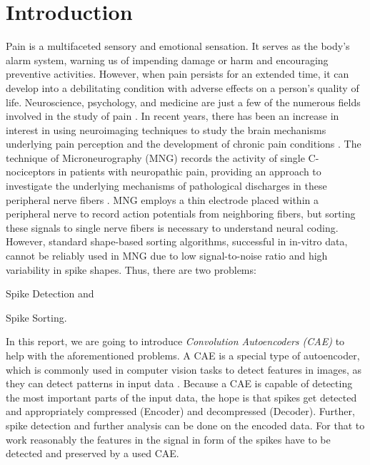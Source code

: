 \section{Introduction}
\label{sec:intro}
Pain is a multifaceted sensory and emotional sensation.
It serves as the body's alarm system, warning us of impending damage or harm and encouraging preventive activities.
However, when pain persists for an extended time, it can develop into a debilitating condition with adverse effects on a person's quality of life.
Neuroscience, psychology, and medicine are just a few of the numerous fields involved in the study of pain \cite{robins2016pain,eccleston2013psychological}.
In recent years, there has been an increase in interest in using neuroimaging techniques to study the brain mechanisms underlying pain perception and the development of chronic pain conditions \cite{schmidt2015neuroimaging, da2019neuroimaging}.
The technique of Microneurography (MNG) records the activity of single C-nociceptors in patients with neuropathic pain, providing an approach to investigate the underlying mechanisms of pathological discharges in these peripheral nerve fibers \cite{vallbo2004microneurography,vallbo2018microneurography}.
MNG employs a thin electrode placed within a peripheral nerve to record action potentials from neighboring fibers, but sorting these signals to single nerve fibers is necessary to understand neural coding. 
However, standard shape-based sorting algorithms, successful in in-vitro data, cannot be reliably used in MNG due to low signal-to-noise ratio and high variability in spike shapes. %
Thus, there are two problems: 
\begin{enumerate*}
	\item Spike Detection and
	\item Spike Sorting.
\end{enumerate*}
In this report, we are going to introduce \textit{Convolution Autoencoders (CAE)} to help with the aforementioned problems.
A CAE is a special type of  autoencoder, which is commonly used in computer vision tasks to detect features in images, as they can detect patterns in input data \cite{geron2017hands,geng2016human,cheng2018deep}.
Because a CAE is capable of detecting the most important parts of the input data, the hope is that spikes get detected and appropriately compressed (Encoder) and decompressed (Decoder).
Further, spike detection and further analysis can be done on the encoded data.
For that to work reasonably the features in the signal in form of the spikes have to be detected and preserved by a used CAE.
